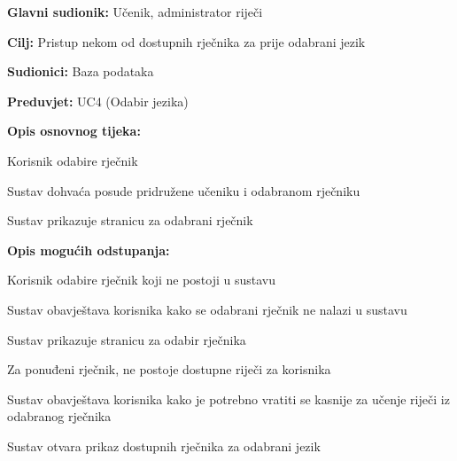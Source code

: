 					
					\noindent {}
					\begin{packed_item}
						
						\item \textbf{Glavni sudionik: }Učenik, administrator riječi
						\item  \textbf{Cilj:} Pristup nekom od dostupnih rječnika za prije odabrani jezik
						\item  \textbf{Sudionici:} Baza podataka
						\item  \textbf{Preduvjet:} UC4 (Odabir jezika)
						\item  \textbf{Opis osnovnog tijeka:}
						
						\item[] \begin{packed_enum}
							
							\item Korisnik odabire rječnik
							\item Sustav dohvaća posude pridružene učeniku i odabranom rječniku
							\item Sustav prikazuje stranicu za odabrani rječnik
						\end{packed_enum}
						
						\item  \textbf{Opis mogućih odstupanja:}
						
						\item[] \begin{packed_item}
							
							\item[1.a] Korisnik odabire rječnik koji ne postoji u sustavu
							\item[] \begin{packed_enum}
								
								\item Sustav obavještava korisnika kako se odabrani rječnik ne nalazi u sustavu
								\item Sustav prikazuje stranicu za odabir rječnika
								
							\end{packed_enum}
							
							\item[1.b] Za ponuđeni rječnik, ne postoje dostupne riječi za korisnika
							\item[] \begin{packed_enum}
								
								\item Sustav obavještava korisnika kako je potrebno vratiti se kasnije za učenje riječi iz odabranog rječnika
								\item Sustav otvara prikaz dostupnih rječnika za odabrani jezik
								

\end{packed_enum}
\end{packed_item}
\end{packed_item}
